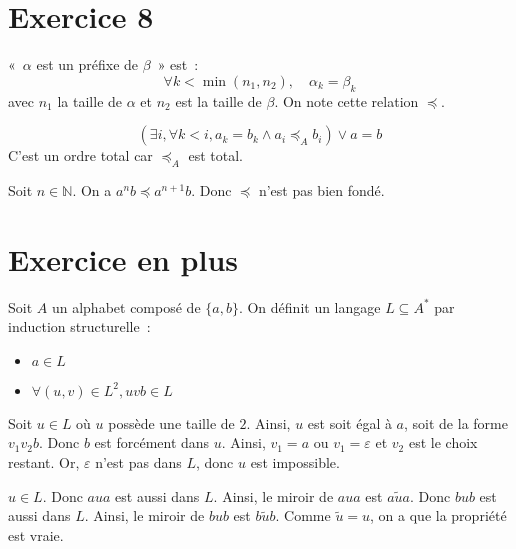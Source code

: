 \documentclass[a4paper]{article}
\begin{document}
    \section*{Exercice 8}
    «~$\alpha$ est un préfixe de $\beta$~» est~:
    $$ \forall k < \min(n_1,n_2),\quad \alpha_k = \beta_k $$
    avec $n_1$ la taille de $\alpha$ et $n_2$ est la taille de $\beta$.
    On note cette relation $\preceq$.

    $$ (\exists i, \forall k < i, a_k = b_k \land a_i \preceq_A b_i) \lor a = b$$
    C'est un ordre total car $\preceq_A$ est total.

    Soit $n\in\mathbb{N}$.
    On a $a^nb \preceq a^{n+1}b$.
    Donc $\preceq$ n'est pas bien fondé.
    \section*{Exercice en plus}
    Soit $A$ un alphabet composé de $\{a,b\}$.
    On définit un langage $L\subseteq A^*$ par induction structurelle~:
    \begin{itemize}
        \item $a\in L$
        \item $\forall (u,v)\in L^2, uvb\in L$
    \end{itemize}
    Soit $u\in L$ où $u$ possède une taille de $2$.
    Ainsi, $u$ est soit égal à $a$, soit de la forme $v_1v_2b$.
    Donc $b$ est forcément dans $u$.
    Ainsi, $v_1 = a$ ou $v_1 = \varepsilon$ et $v_2$ est le choix restant.
    Or, $\varepsilon$ n'est pas dans $L$, donc $u$ est impossible.

    $u\in L$.
    Donc $aua$ est aussi dans $L$. Ainsi, le miroir de $aua$ est $a\tilde u a$.
    Donc $bub$ est aussi dans $L$. Ainsi, le miroir de $bub$ est $b\tilde u b$.
    Comme $\tilde u = u$, on a que la propriété est vraie.
\end{document}

